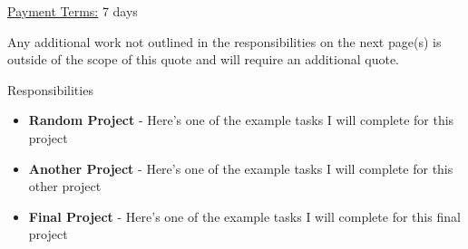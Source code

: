 \documentclass{letter}
\newlength{\totalwidth}\setlength{\totalwidth}{4.5cm}
\begin{document}
\par\vspace{2ex}\noindent\hfill\underline{}

\vspace{3 cm}

\underline{Payment Terms:} 7 days

\vspace{0.5 cm}

\small{Any additional work not outlined in the responsibilities on the next page(s) is outside of the scope of this quote and will require an additional quote.}

\newpage

\Large{Responsibilities}

\begin{itemize}
  \item \textbf{Random Project} - Here's one of the example tasks I will complete for this project
  \item \textbf{Another Project} - Here's one of the example tasks I will complete for this other project
  \item \textbf{Final Project} - Here's one of the example tasks I will complete for this final project
\end{itemize}
\end{document}
